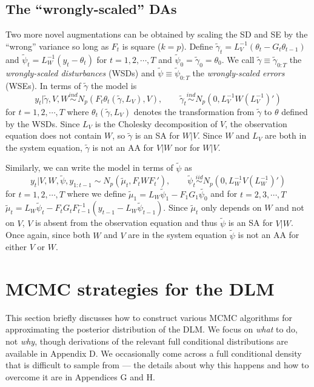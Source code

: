 \documentclass[12pt]{article}
\begin{document}
\subsection{The ``wrongly-scaled'' DAs}
Two more novel augmentations can be obtained by scaling the SD and SE by the ``wrong'' variance so long as $F_t$ is square ($k=p$). Define $\tilde{\gamma}_t=L_V^{-1}(\theta_t - G_t\theta_{t-1})$ and $\tilde{\psi}_t=L_W^{-1}(y_t - \theta_t)$ for $t=1,2,\cdots,T$ and $\tilde{\psi}_0=\tilde{\gamma}_0=\theta_0$. We call $\tilde{\gamma}\equiv\tilde{\gamma}_{0:T}$ the {\it wrongly-scaled disturbances} (WSDs) and $\tilde{\psi}\equiv\tilde{\psi}_{0:T}$ the {\it wrongly-scaled errors} (WSEs). In terms of $\tilde{\gamma}$ the model is \vspace{-.3cm}
\[
  y_t|\tilde{\gamma},V,W \stackrel{ind}{\sim} N_p\left(F_t\theta_t(\tilde{\gamma},L_V), V\right), \qquad  
  \tilde{\gamma}_t \stackrel{ind}{\sim}N_p(0,L_V^{-1}W(L_V^{-1})')
\]
for $t=1,2,\cdots,T$ where $\theta_t(\tilde{\gamma},L_V)$ denotes the transformation from $\tilde{\gamma}$ to $\theta$ defined by the WSDs. Since $L_V$ is the Cholesky decomposition of $V$, the observation equation does not contain $W$, so $\tilde{\gamma}$ is an SA for $W|V$. Since $W$ and $L_V$ are both in the system equation, $\tilde{\gamma}$ is not an AA for $V|W$ nor for $W|V$. 

Similarly, we can write the model in terms of $\tilde{\psi}$ as \vspace{-.3cm}
\[
  y_t|V,W,\tilde{\psi},y_{1:t-1} \sim N_p(\tilde{\mu}_t, F_tWF_t'), \qquad 
  \tilde{\psi}_t  \stackrel{iid}{\sim} N_p(0,L_W^{-1}V(L_W^{-1})')
\]
for $t=1,2,\cdots,T$ where we define $\tilde{\mu}_1 = L_W\tilde{\psi}_1 - F_1G_1\tilde{\psi_0}$ and for $t=2,3,\cdots,T$ $\tilde{\mu}_t =L_W\tilde{\psi}_t - F_tG_tF_{t-1}^{-1}(y_{t-1} - L_{W}\tilde{\psi}_{t-1})$. Since $\tilde{\mu}_t$ only depends on $W$ and not on $V$, $V$ is absent from the observation equation and thus $\tilde{\psi}$ is an SA for $V|W$. Once again, since both $W$ and $V$ are in the system equation $\tilde{\psi}$ is not an AA for either $V$ or $W$.


\section{MCMC strategies for the DLM}\label{sec:Algs}

This section briefly discusses how to construct various MCMC algorithms for approximating the posterior distribution of the DLM. We focus on {\it what} to do, not {\it why}, though derivations of the relevant full conditional distributions are available in Appendix D. We occasionally come across a full conditional density that is difficult to sample from --- the details about why this happens and how to overcome it are in Appendices G and H.
\end{document}
